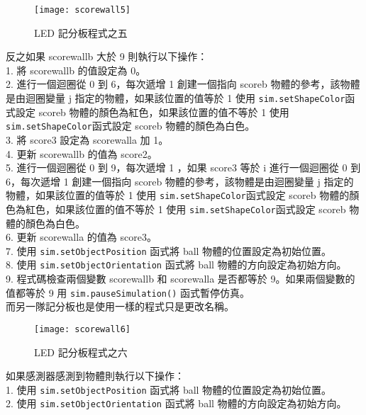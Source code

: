 \begin{figure}[hbt!]
\begin{center}
\texttt{[image: scorewall5]}
\caption{\Large LED 記分板程式之五}\label{LED 記分板程式之五}
\end{center}
\end{figure} 
反之如果 scorewallb 大於 9 則執行以下操作：\\
1. 將 scorewallb 的值設定為 0。\\
2. 進行一個迴圈從 0 到 6，每次遞增 1 創建一個指向 scoreb 物體的參考，該物體是由迴圈變量 j 指定的物體，如果該位置的值等於 1 使用 \texttt{sim.setShapeColor}函式設定 scoreb 物體的顏色為紅色，如果該位置的值不等於 1 使用 \texttt{sim.setShapeColor}函式設定 scoreb 物體的顏色為白色。\\
3. 將 score3 設定為 scorewalla 加 1。\\
4. 更新 scorewallb 的值為 score2。\\
5. 進行一個迴圈從 0 到 9，每次遞增 1 ，如果 score3 等於 i 進行一個迴圈從 0 到 6，每次遞增 1 創建一個指向 scoreb 物體的參考，該物體是由迴圈變量 j 指定的物體，如果該位置的值等於 1 使用 \texttt{sim.setShapeColor}函式設定 scoreb 物體的顏色為紅色，如果該位置的值不等於 1 使用 \texttt{sim.setShapeColor}函式設定 scoreb 物體的顏色為白色。\\
6. 更新 scorewalla 的值為 score3。\\
7. 使用 \texttt{sim.setObjectPosition} 函式將 ball 物體的位置設定為初始位置。\\
8. 使用 \texttt{sim.setObjectOrientation} 函式將 ball 物體的方向設定為初始方向。\\
9. 程式碼檢查兩個變數 scorewallb 和 scorewalla 是否都等於 9。如果兩個變數的值都等於 9 用  \texttt{sim.pauseSimulation()} 函式暫停仿真。\\
而另一隊記分板也是使用一樣的程式只是更改名稱。\\

\begin{figure}[hbt!]
\begin{center}
\texttt{[image: scorewall6]}
\caption{\Large LED 記分板程式之六}\label{LED 記分板程式之六}
\end{center}
\end{figure} 
如果感測器感測到物體則執行以下操作：\\
1. 使用 \texttt{sim.setObjectPosition} 函式將 ball 物體的位置設定為初始位置。\\
2. 使用 \texttt{sim.setObjectOrientation} 函式將 ball 物體的方向設定為初始方向。\\
\newpage


